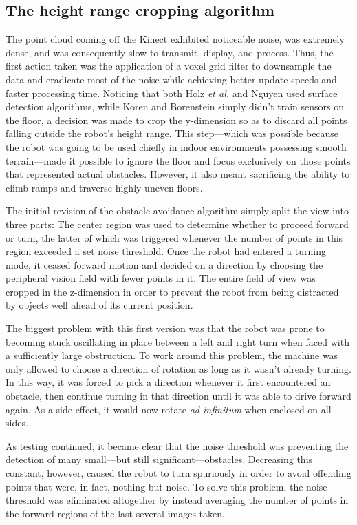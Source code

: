 \documentclass[12pt]{report}
\begin{document}
\subsection[Height range cropping]{The height range cropping algorithm}
The point cloud coming off the Kinect exhibited noticeable noise, was extremely dense, and was consequently slow to transmit, display, and process.  Thus, the first action taken was the application of a voxel grid filter to downsample the data and eradicate most of the noise while achieving better update speeds and faster processing time.  Noticing that both Holz \textit{et al.} and Nguyen used surface detection algorithms, while Koren and Borenstein simply didn't train sensors on the floor, a decision was made to crop the y-dimension so as to discard all points falling outside the robot's height range.  This step---which was possible because the robot was going to be used chiefly in indoor environments possessing smooth terrain---made it possible to ignore the floor and focus exclusively on those points that represented actual obstacles.  However, it also meant sacrificing the ability to climb ramps and traverse highly uneven floors.

The initial revision of the obstacle avoidance algorithm simply split the view into three parts:  The center region was used to determine whether to proceed forward or turn, the latter of which was triggered whenever the number of points in this region exceeded a set noise threshold.  Once the robot had entered a turning mode, it ceased forward motion and decided on a direction by choosing the peripheral vision field with fewer points in it.  The entire field of view was cropped in the z-dimension in order to prevent the robot from being distracted by objects well ahead of its current position.

The biggest problem with this first version was that the robot was prone to becoming stuck oscillating in place between a left and right turn when faced with a sufficiently large obstruction.  To work around this problem, the machine was only allowed to choose a direction of rotation as long as it wasn't already turning.  In this way, it was forced to pick a direction whenever it first encountered an obstacle, then continue turning in that direction until it was able to drive forward again.  As a side effect, it would now rotate \textit{ad infinitum} when enclosed on all sides.

As testing continued, it became clear that the noise threshold was preventing the detection of many small---but still significant---obstacles.  Decreasing this constant, however, caused the robot to turn spuriously in order to avoid offending points that were, in fact, nothing but noise.  To solve this problem, the noise threshold was eliminated altogether by instead averaging the number of points in the forward regions of the last several images taken.
\end{document}
